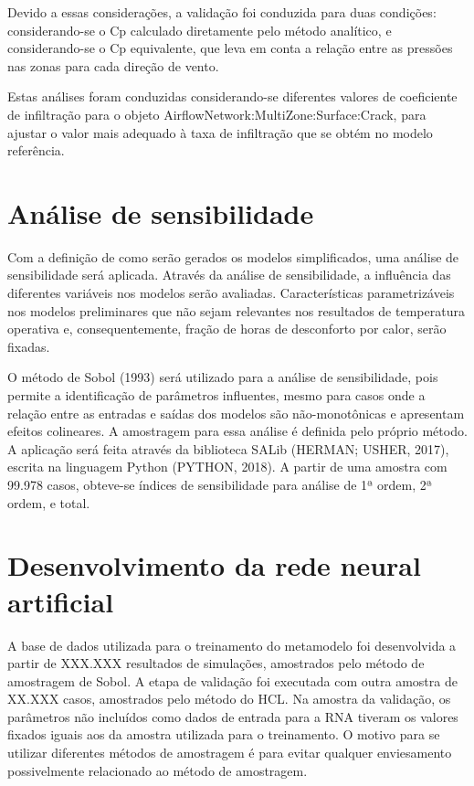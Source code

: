\documentclass[brazil,hardcopy,openany,a5paper]{ufscthesis}
\begin{document}
	Devido a essas considerações, a validação foi conduzida para duas condições: considerando-se o Cp calculado diretamente pelo método analítico, e considerando-se o Cp equivalente, que leva em conta a relação entre as pressões nas zonas para cada direção de vento.
	
	Estas análises foram conduzidas considerando-se diferentes valores de coeficiente de infiltração para o objeto AirflowNetwork:MultiZone:Surface:Crack, para ajustar o valor mais adequado à taxa de infiltração que se obtém no modelo referência.
	
	
	\section{Análise de sensibilidade}
	
	Com a definição de como serão gerados os modelos simplificados, uma análise de sensibilidade será aplicada. Através da análise de sensibilidade, a influência das diferentes variáveis nos modelos serão avaliadas. Características parametrizáveis nos modelos preliminares que não sejam relevantes nos resultados de temperatura operativa e, consequentemente, fração de horas de desconforto por calor, serão fixadas.
	
	O método de Sobol (1993) será utilizado para a análise de sensibilidade, pois permite a identificação de parâmetros influentes, mesmo para casos onde a relação entre as entradas e saídas dos modelos são não-monotônicas  e apresentam efeitos colineares. A amostragem para essa análise é definida pelo próprio método. A aplicação será feita através da biblioteca SALib (HERMAN; USHER, 2017), escrita na linguagem Python (PYTHON, 2018). A partir de uma amostra com 99.978 casos, obteve-se índices de sensibilidade para análise de 1ª ordem, 2ª ordem, e total.
	
	\section{Desenvolvimento da rede neural artificial}
	
	A base de dados utilizada para o treinamento do metamodelo foi desenvolvida a partir de XXX.XXX resultados de simulações, amostrados pelo método de amostragem de Sobol. A etapa de validação foi executada com outra amostra de XX.XXX casos, amostrados pelo método do HCL. Na amostra da validação, os parâmetros não incluídos como dados de entrada para a RNA tiveram os valores fixados iguais aos da amostra utilizada para o treinamento. O motivo para se utilizar diferentes métodos de amostragem é para evitar qualquer enviesamento possivelmente relacionado ao método de amostragem.
	
\end{document}
